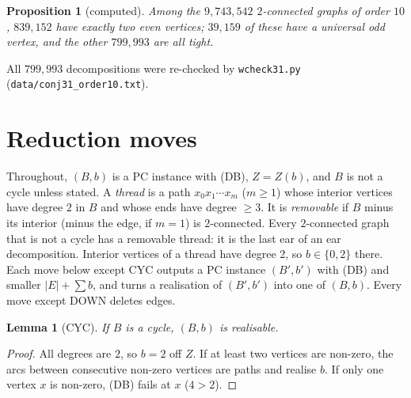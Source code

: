 \documentclass[11pt]{amsart}
\newtheorem{lemma}[theorem]{Lemma}
\newtheorem{proposition}[theorem]{Proposition}
\theoremstyle{definition}
\begin{document}
\begin{proposition}[computed]\label{prop:order10}
Among the $9{,}743{,}542$ $2$-connected graphs of order $10$, $839{,}152$ have exactly two even vertices;
$39{,}159$ of these have a universal odd vertex, and the other $799{,}993$ are all tight.
\end{proposition}

All $799{,}993$ decompositions were re-checked by \texttt{wcheck31.py} (\texttt{data/conj31\_order10.txt}).

\section{Reduction moves}\label{sec:moves}

Throughout, $(B,b)$ is a PC instance with (DB), $Z=Z(b)$, and $B$ is not a cycle unless stated. A
\emph{thread} is a path $x_0x_1\cdots x_m$ ($m\ge1$) whose interior vertices have degree $2$ in $B$ and
whose ends have degree $\ge3$. It is \emph{removable} if $B$ minus its interior (minus the edge, if $m=1$)
is $2$-connected. Every $2$-connected graph that is not a cycle has a removable thread: it is the last ear
of an ear decomposition. Interior vertices of a thread have degree $2$, so $b\in\{0,2\}$ there. Each move
below except CYC outputs a PC instance $(B',b')$ with (DB) and smaller $|E|+\sum b$, and turns a realisation
of $(B',b')$ into one of $(B,b)$. Every move except DOWN deletes edges.

\begin{lemma}[CYC]\label{lem:cyc}
If $B$ is a cycle, $(B,b)$ is realisable.
\end{lemma}
\begin{proof}
All degrees are $2$, so $b=2$ off $Z$. If at least two vertices are non-zero, the arcs between consecutive
non-zero vertices are paths and realise $b$. If only one vertex $x$ is non-zero, (DB) fails at $x$
($4>2$).
\end{proof}
\end{document}
